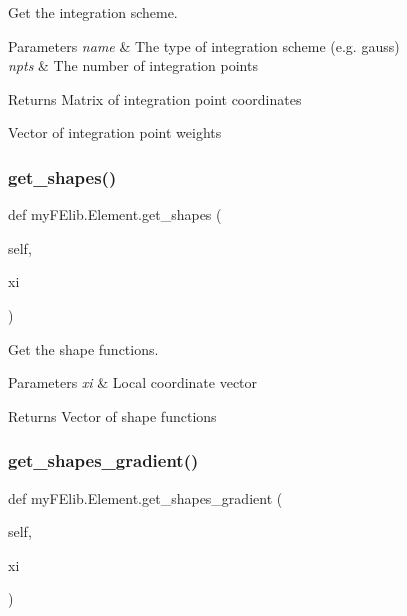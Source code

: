 Get the integration scheme. 


\begin{DoxyParams}{Parameters}
{\em name} & The type of integration scheme (e.\+g. \textquotesingle{}gauss\textquotesingle{}) \\
\hline
{\em npts} & The number of integration points \\
\hline
\end{DoxyParams}
\begin{DoxyReturn}{Returns}
Matrix of integration point coordinates 

Vector of integration point weights 
\end{DoxyReturn}
\mbox{\label{classmyFElib_1_1Element_a823f78b5325d510849f80ec6e6323c9d}} 
\subsubsection{\texorpdfstring{get\+\_\+shapes()}{get\_shapes()}}
{\footnotesize\ttfamily def my\+F\+Elib.\+Element.\+get\+\_\+shapes (\begin{DoxyParamCaption}\item[{}]{self,  }\item[{}]{xi }\end{DoxyParamCaption})}



Get the shape functions. 


\begin{DoxyParams}{Parameters}
{\em xi} & Local coordinate vector \\
\hline
\end{DoxyParams}
\begin{DoxyReturn}{Returns}
Vector of shape functions 
\end{DoxyReturn}
\mbox{\label{classmyFElib_1_1Element_a38722fb0162b81dcf891f393eaf4d1ca}} 
\subsubsection{\texorpdfstring{get\+\_\+shapes\+\_\+gradient()}{get\_shapes\_gradient()}}
{\footnotesize\ttfamily def my\+F\+Elib.\+Element.\+get\+\_\+shapes\+\_\+gradient (\begin{DoxyParamCaption}\item[{}]{self,  }\item[{}]{xi }\end{DoxyParamCaption})}



